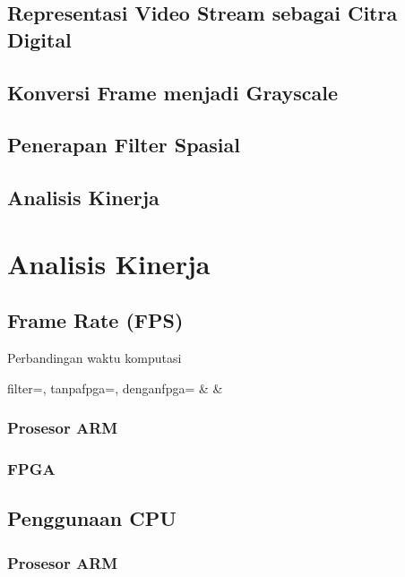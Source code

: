 \subsection{Representasi Video Stream sebagai Citra Digital}
\subsection{Konversi Frame menjadi Grayscale}
\subsection{Penerapan Filter Spasial}
\subsection{Analisis Kinerja}


\section{Analisis Kinerja}
\subsection{Frame Rate (FPS)}

\begin{atable}
    \caption{Perbandingan waktu komputasi}
    \label{table:hasil-fps}
        {filter=\filter, tanpafpga=\tanpafpga, denganfpga=\denganfpga}
        {\filter & \tanpafpga & \denganfpga }
\end{atable}

\subsubsection{Prosesor ARM}
\subsubsection{FPGA}

\subsection{Penggunaan CPU}
\blindtext
\subsubsection{Prosesor ARM}
